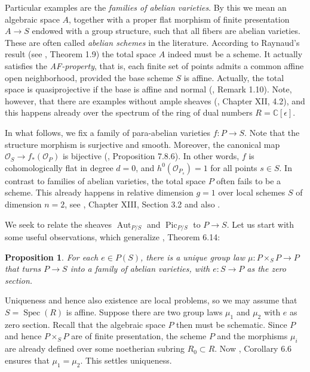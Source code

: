 \documentclass[oneside, 12pt]{amsart}
\newcommand\mylabel[1]{\label{#1}\marginpar{\raggedright\vspace{-1ex}\medskip\medskip\footnotesize \tt #1}}
\renewcommand\mylabel[1]{\label{#1}}
\newtheorem{proposition}[theorem]{Proposition}
\theoremstyle{definition}
\theoremstyle{remark}
\newcommand{\CC}{\mathbb{C}}
\newcommand{\Aut}{\operatorname{Aut}}
\renewcommand{\O}{\mathscr{O}}
\newcommand{\Pic}{\operatorname{Pic}}
\newcommand{\ra}{\rightarrow}
\newcommand{\Spec}{\operatorname{Spec}}
\begin{document}
Particular examples are the   \emph{families of abelian varieties}. By this we mean an algebraic space $A$,
together with a proper flat  morphism of finite presentation $A\ra S$ endowed with a group structure, such that all fibers are abelian varieties.
These are often called \emph{abelian schemes} in the literature.
According to  Raynaud's result (see \cite{Faltings; Chai 1990}, Theorem 1.9)
the total space $A$ indeed must be a scheme. It actually satisfies the \emph{AF-property}, that is, each finite set of points
admits a common affine open neighborhood, provided the base scheme $S$ is affine. 
Actually, the total space is quasiprojective if the base is affine and normal (\cite{Faltings; Chai 1990}, Remark 1.10).
Note, however, that there are examples without ample sheaves
(\cite{Raynaud 1970}, Chapter XII, 4.2), and this happens already over the spectrum of the   ring of dual numbers $R=\CC[\epsilon]$.

In what follows, we fix a family of para-abelian varieties $f:P\ra S$. Note that the  structure morphism
is    surjective and smooth.
Moreover, the canonical map $\O_S\ra f_*(\O_P)$ is bijective (\cite{EGA IIIb}, Proposition 7.8.6).
In other words, $f$ is cohomologically flat in degree $d=0$, and $h^0(\O_{P_s})=1$ for
all points $s\in S$.
In contrast to families of abelian varieties, the total space $P$ often fails to be a scheme.
This already happens in relative dimension $g=1$ over local schemes $S$ of dimension $n=2$, see \cite{Raynaud 1970}, Chapter XIII, Section 3.2
and also \cite{Zomervrucht 2015}.

We seek to relate the sheaves  $\Aut_{P/S}$ and   $\Pic_{P/S}$   to $P\ra S$. Let us start with some useful observations,
which generalize  \cite{Mumford; Fogarty; Kirwan 1993}, Theorem 6.14:

\begin{proposition}
\mylabel{group law}
For each   $e\in P(S)$, there is a unique group law $\mu:P\times_SP\ra P$
that turns $P\ra S$ into a family of abelian varieties, with $e:S\ra P$ as the zero section.
\end{proposition}

\proof
Uniqueness and hence also existence are local problems, so we may assume that $S=\Spec(R)$ is affine.
Suppose there are two group laws $\mu_1$ and $\mu_2$ with $e$ as zero section.
Recall that the algebraic space $P$ then must be schematic.
Since $P$ and hence $P\times_SP$ are of finite presentation,  the scheme $P$ and the morphisms $\mu_i$
are already defined over some noetherian subring $R_0\subset R$.
Now \cite{Mumford; Fogarty; Kirwan 1993}, Corollary 6.6 ensures that $\mu_1=\mu_2$. This settles uniqueness. 
\end{document}
